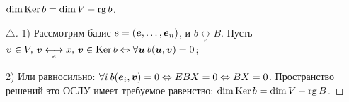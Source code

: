\begin{to_thr} 
	$\dim \mathop{\mathrm{Ker}}\nolimits b = \dim V - \mathop{\mathrm{rg}}\nolimits b$.
\end{to_thr}

\begin{proof}[$\triangle$]
	1) Рассмотрим базис $e = (\mbox{\boldmath $e$},\ldots,\mbox{\boldmath $e$}_n)$, и $b \underset{e}{\longleftrightarrow} B$. Пусть $\mbox{\boldmath $v$}\in V, \, \mbox{\boldmath $v$} \underset{e}{\longleftrightarrow} x, \, \mbox{\boldmath $v$} \in \mathop{\mathrm{Ker}}\nolimits b \Leftrightarrow \forall \mbox{\boldmath $u$} \: b(\mbox{\boldmath $u$},\mbox{\boldmath $v$}) = 0$;

	2) Или равносильно: $\forall i \: b(\mbox{\boldmath $e$}_i, \mbox{\boldmath $v$}) = 0 \Leftrightarrow E B X = 0 \Leftrightarrow B X = 0$. Пространство решений это ОСЛУ имеет требуемое равенство: $\dim \mathop{\mathrm{Ker}}\nolimits b = \dim V - \mathop{\mathrm{rg}}\nolimits B$.
\end{proof}







	